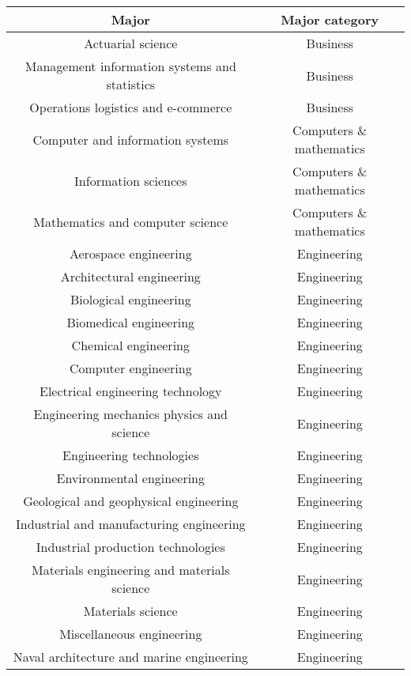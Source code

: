 \documentclass[11pt]{article}
\begin{document}
\begin{center}
    \begin{tabular} {|| c c ||}
    \hline
    Major & Major category \\ [0.5ex]
    \hline\hline
    Actuarial science & Business \\
    \hline
    Management information systems and statistics & Business \\
    \hline
    Operations logistics and e-commerce & Business \\
    \hline
    Computer and information systems & Computers \& mathematics \\
    \hline
    Information sciences & Computers \& mathematics \\
    \hline
    Mathematics and computer science & Computers \& mathematics \\
    \hline
    Aerospace engineering & Engineering \\
    \hline
    Architectural engineering & Engineering \\
    \hline
    Biological engineering & Engineering \\
    \hline
    Biomedical engineering & Engineering \\
    \hline
    Chemical engineering & Engineering \\
    \hline
    Computer engineering & Engineering \\
    \hline
    Electrical engineering technology & Engineering \\
    \hline
    Engineering mechanics physics and science & Engineering \\
    \hline
    Engineering technologies & Engineering \\
    \hline
    Environmental engineering & Engineering \\
    \hline
    Geological and geophysical engineering & Engineering \\
    \hline
    Industrial and manufacturing engineering & Engineering \\
    \hline
    Industrial production technologies & Engineering \\
    \hline
    Materials engineering and materials science & Engineering \\
    \hline
    Materials science & Engineering \\
    \hline
    Miscellaneous engineering & Engineering \\
    \hline
    Naval architecture and marine engineering & Engineering \\

\end{tabular}
\end{center}
\end{document}
